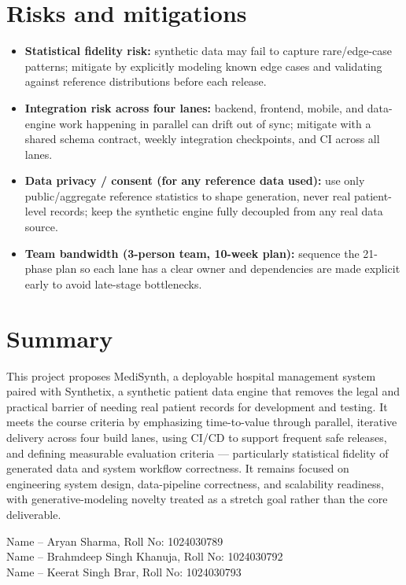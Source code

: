 \documentclass[11pt]{article}
\begin{document}
\section{Risks and mitigations}
\begin{itemize}
    \item \textbf{Statistical fidelity risk:} synthetic data may fail to capture rare/edge-case patterns; mitigate by explicitly modeling known edge cases and validating against reference distributions before each release.
    \item \textbf{Integration risk across four lanes:} backend, frontend, mobile, and data-engine work happening in parallel can drift out of sync; mitigate with a shared schema contract, weekly integration checkpoints, and CI across all lanes.
    \item \textbf{Data privacy / consent (for any reference data used):} use only public/aggregate reference statistics to shape generation, never real patient-level records; keep the synthetic engine fully decoupled from any real data source.
    \item \textbf{Team bandwidth (3-person team, 10-week plan):} sequence the 21-phase plan so each lane has a clear owner and dependencies are made explicit early to avoid late-stage bottlenecks.
\end{itemize}

\section{Summary}
This project proposes MediSynth, a deployable hospital management system paired with Synthetix, a synthetic patient data engine that removes the legal and practical barrier of needing real patient records for development and testing. It meets the course criteria by emphasizing time-to-value through parallel, iterative delivery across four build lanes, using CI/CD to support frequent safe releases, and defining measurable evaluation criteria --- particularly statistical fidelity of generated data and system workflow correctness. It remains focused on engineering system design, data-pipeline correctness, and scalability readiness, with generative-modeling novelty treated as a stretch goal rather than the core deliverable.

\vspace{1cm}
\noindent
Name -- Aryan Sharma, Roll No: 1024030789 \\
Name -- Brahmdeep Singh Khanuja, Roll No: 1024030792 \\
Name -- Keerat Singh Brar, Roll No: 1024030793
\end{document}
